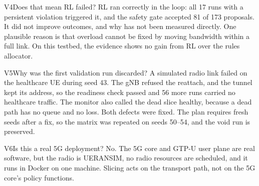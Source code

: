 \begin{qa}{V4}{Does that mean RL failed?}
RL ran correctly in the loop: all 17 runs with a persistent violation triggered it, and the safety gate accepted 81
of 173 proposals. It did not improve outcomes, and why has not been measured directly. One plausible reason is that
overload cannot be fixed by moving bandwidth within a full link. On this testbed, the evidence shows no gain from RL
over the rules allocator.
\end{qa}

\begin{qa}{V5}{Why was the first validation run discarded?}
A simulated radio link failed on the healthcare UE during seed 43. The gNB refused the reattach, and the tunnel kept
its address, so the readiness check passed and 56 more runs carried no healthcare traffic. The monitor also called
the dead slice healthy, because a dead path has no queue and no loss. Both defects were fixed. The plan requires
fresh seeds after a fix, so the matrix was repeated on seeds 50--54, and the void run is preserved.
\end{qa}

\begin{qa}{V6}{Is this a real 5G deployment?}
No. The 5G core and GTP-U user plane are real software, but the radio is UERANSIM, no radio resources are scheduled,
and it runs in Docker on one machine. Slicing acts on the transport path, not on the 5G core's policy functions.
\end{qa}
